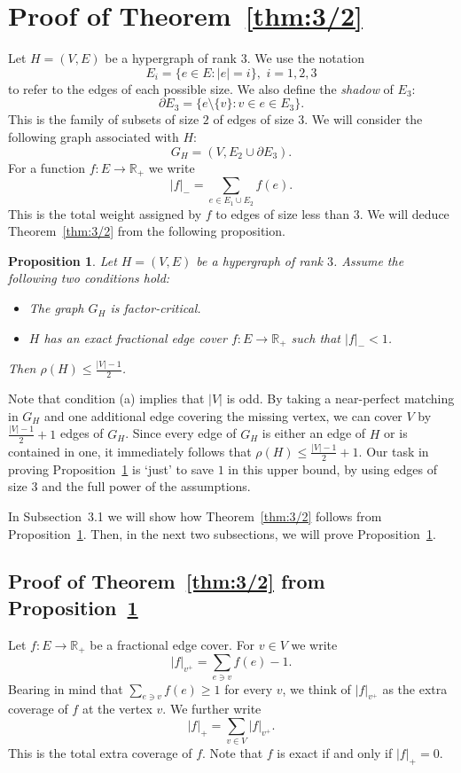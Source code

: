 \documentclass{article}
\newtheorem{proposition}[theorem]{Proposition}
\theoremstyle{definition}
\begin{document}
\section{Proof of Theorem~\ref{thm:3/2}}
Let $H = (V, E)$ be a hypergraph of rank $3$. We use the notation \[ E_i = \{ e \in E: |e| = i\}, \,\, i = 1,2,3\]
to refer to the edges of each possible size. We also define the \emph{shadow} of $E_3$: \[ \partial E_3 = \{ e \setminus \{v\}: v \in e \in E_3\}.\] This is the family of subsets of size $2$ of edges of size $3$. We will consider the following graph associated with $H$: \[G_H = (V, E_2 \cup \partial E_3).\] For a function $f: E \to \mathbb{R}_+$ we write \[ |f|_- = \sum_{e \in E_1 \cup E_2} f(e).\] This is the total weight assigned by $f$ to edges of size less than $3$. We will deduce Theorem~\ref{thm:3/2} from the following proposition.
\begin{proposition} \label{pro:Cover}
Let $H = (V, E)$ be a hypergraph of rank $3$. Assume the following two conditions hold:
\begin{itemize}
    \item[(a)] The graph $G_H$ is factor-critical.
    \item[(b)] $H$ has an exact fractional edge cover $f: E \to \mathbb{R}_+$ such that $|f|_- < 1$.
\end{itemize}
Then $\rho(H) \le \frac{|V|-1}{2}$.
\end{proposition}
Note that condition (a) implies that $|V|$ is odd. By taking a near-perfect matching in $G_H$ and one additional edge covering the missing vertex, we can cover $V$ by $\frac{|V|-1}{2} + 1$ edges of $G_H$. Since every edge of $G_H$ is either an edge of $H$ or is contained in one, it immediately follows that $\rho(H) \le \frac{|V|-1}{2} + 1$. Our task in proving Proposition~\ref{pro:Cover} is `just' to save $1$ in this upper bound, by using edges of size $3$ and the full power of the assumptions.

In Subsection~3.1 we will show how Theorem~\ref{thm:3/2} follows from Proposition~\ref{pro:Cover}. Then, in the next two subsections, we will prove Proposition~\ref{pro:Cover}.

\subsection{Proof of Theorem~\ref{thm:3/2} from Proposition~\ref{pro:Cover}}
Let $f: E \to \mathbb{R}_+$ be a fractional edge cover. For $v \in V$ we write \[ |f|_{v^+} = \sum_{e \ni v} f(e) - 1.\] Bearing in mind that $\sum_{e \ni v} f(e) \ge 1$ for every $v$, we think of $|f|_{v^+}$ as the extra coverage of $f$ at the vertex $v$. We further write \[ |f|_+ = \sum_{v \in V} |f|_{v^+}.\] This is the total extra coverage of $f$. Note that $f$ is exact if and only if $|f|_+ = 0$.
\end{document}

